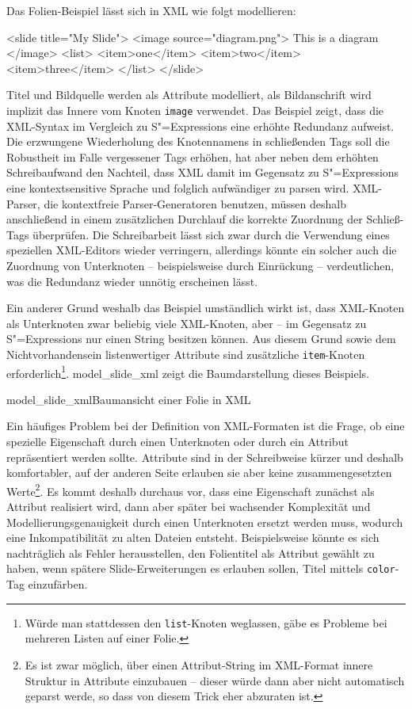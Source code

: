 \documentclass[11pt, a4paper, bibgerm]{scrbook}
\newenvironment{DIFnomarkup}{}{}
\newcommand\icode[1]{\lstinline?#1?}
\newcommand\abb{}
\newcommand\fig{}
\newcommand{\sexps}{S"=Expressions}
\begin{document}
Das Folien-Beispiel lässt sich in XML wie folgt modellieren:
\begin{DIFnomarkup}\begin{code}
<slide title="My Slide">
  <image source="diagram.png">
    This is a diagram
  </image>
  <list>
    <item>one</item>
    <item>two</item>
    <item>three</item>
  </list>
</slide>
\end{code}\end{DIFnomarkup} %
Titel und Bildquelle werden als Attribute modelliert, als
Bildanschrift wird implizit das Innere vom Knoten \icode{image}
verwendet. Das Beispiel zeigt, dass die XML-Syntax im Vergleich zu
\sexps{} eine erhöhte Redundanz aufweist. Die erzwungene Wiederholung
des Knotennamens in schließenden Tags soll die Robustheit im Falle
vergessener Tags erhöhen, hat aber neben dem erhöhten Schreibaufwand den
Nachteil, dass XML damit im Gegensatz zu \sexps{} eine kontextsensitive
Sprache und folglich aufwändiger zu parsen wird. XML-Parser, die
kontextfreie Parser-Generatoren benutzen, müssen deshalb anschließend in
einem zusätzlichen Durchlauf die korrekte Zuordnung der Schließ-Tags
überprüfen. Die Schreibarbeit lässt sich zwar durch die Verwendung eines
speziellen XML-Editors wieder verringern, allerdings könnte ein solcher
auch die Zuordnung von Unterknoten -- beispielsweise durch Einrückung -- 
verdeutlichen, was die Redundanz wieder unnötig erscheinen lässt.

Ein anderer Grund weshalb das Beispiel umständlich wirkt ist, dass
XML-Knoten als Unterknoten zwar beliebig viele XML-Knoten, aber -- im
Gegensatz zu \sexps{} nur einen String besitzen können. Aus diesem Grund
sowie dem Nichtvorhandensein listenwertiger Attribute sind zusätzliche
\icode{item}-Knoten erforderlich\footnote{Würde man stattdessen den
\icode{list}-Knoten weglassen, gäbe es Probleme bei mehreren Listen auf
einer Folie.}. \abb{model_slide_xml} zeigt die Baumdarstellung dieses
Beispiels.

\fig{model_slide_xml}{Baumansicht einer Folie in XML}

Ein häufiges Problem bei der Definition von XML-Formaten ist die Frage,
ob eine spezielle Eigenschaft durch einen Unterknoten oder durch ein
Attribut repräsentiert werden sollte. Attribute sind in der Schreibweise
kürzer und deshalb komfortabler, auf der anderen Seite erlauben sie aber
keine zusammengesetzten Werte\footnote{Es ist zwar möglich, über einen
  Attribut-String im XML-Format innere Struktur in Attribute einzubauen
  -- dieser würde dann aber nicht automatisch geparst werde, so dass von
  diesem Trick eher abzuraten ist.}. Es kommt deshalb durchaus vor, dass
eine Eigenschaft zunächst als Attribut realisiert wird, dann aber später
bei wachsender Komplexität und Modellierungsgenauigkeit durch einen
Unterknoten ersetzt werden muss, wodurch eine Inkompatibilität zu alten
Dateien entsteht. Beispielsweise könnte es sich nachträglich als Fehler
herausstellen, den Folientitel als Attribut gewählt zu haben, wenn
spätere Slide-Erweiterungen es erlauben sollen, Titel mittels
\icode{color}-Tag einzufärben.
\end{document}
